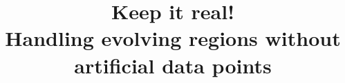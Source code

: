 \documentclass[10pt,letterpaper]{article}
\begin{document}


\doublespacing
\title{Keep it real! \\Handling evolving regions without artificial data points}
\author{}

\maketitle






\end{document}
